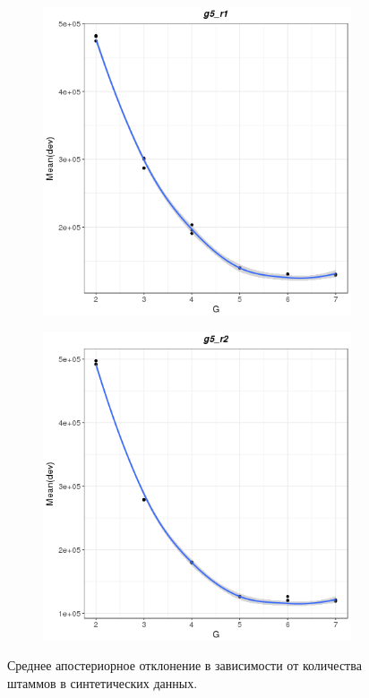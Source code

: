 \documentclass{spbau-diploma}
\begin{document}
\begin{figure}
    \hfill
      
   \begin{subfigure}[b]{0.3\textwidth}
        \includegraphics[width=\textwidth]{pics/devs/g5_r1.png}
    \end{subfigure}
    \qquad
    \begin{subfigure}[b]{0.3\textwidth}
        \includegraphics[width=\textwidth]{pics/devs/g5_r2.png}
    \end{subfigure}
    
    \caption{Среднее апостериорное отклонение в зависимости от количества штаммов в синтетических данных.}
    \label{fig:sim_dev}
\end{figure}
\end{document}
